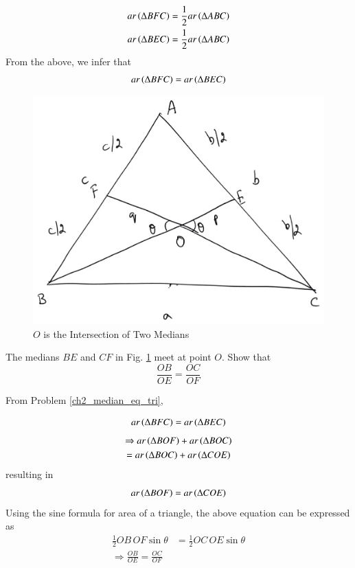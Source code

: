 \begin{align}
ar \left(\Delta BFC\right) &= \frac{1}{2} ar \left(\Delta ABC\right) \\
ar \left(\Delta BEC\right) &= \frac{1}{2} ar \left(\Delta ABC\right) 
\end{align}
From the above, we infer that
%
\begin{equation}
ar \left(\Delta BFC\right) = ar \left(\Delta BEC\right)
\end{equation}


\begin{figure}[!h]
	\begin{center}
		
		\includegraphics[width=\columnwidth]{./figs/ch2_median_ratio}
		\vspace*{-10cm}
	\end{center}
	\caption{$O$ is the Intersection of Two Medians}
	\label{ch2_median_ratio}	
\end{figure}
%
\begin{problem}
	The medians $BE$ and $CF$ in Fig. \ref{ch2_median_ratio} meet at point $O$.  Show that
	\begin{equation}
	\frac{OB}{OE} = \frac{OC}{OF} 
	\end{equation} 
\end{problem}
\proof From Problem \ref{ch2_median_eq_tri},

\begin{equation}
ar \left(\Delta BFC\right) = ar \left(\Delta BEC\right)
\end{equation}
%
\begin{multline}
\Rightarrow ar \left(\Delta BOF\right) + ar \left(\Delta BOC\right) \\
= ar \left(\Delta BOC\right) + ar \left(\Delta COE\right) 
\end{multline}
resulting in
%
\begin{equation}
ar \left(\Delta BOF\right) 
=  ar \left(\Delta COE\right) 
\end{equation}
%
Using the sine formula for area of a triangle, the above equation can be expressed as
%
\begin{align}
\frac{1}{2}OB\,OF \sin \theta &= \frac{1}{2}OC\,OE \sin \theta \\
\Rightarrow 	\frac{OB}{OE} = \frac{OC}{OF} 
\end{align}

